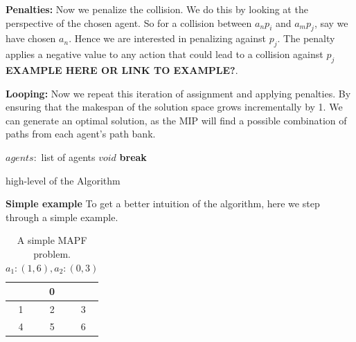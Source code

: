 \documentclass[a4paper,11pt]{article}
\newcommand{\Break}{\State\textbf{break}}
\begin{document}
\noindent \textbf{Penalties:} Now we penalize the collision. We do this by looking at the perspective of the chosen agent. So for a collision between $a_np_i$ and $a_mp_j$, say we have chosen $a_n$. Hence we are interested in penalizing against $p_j$. The penalty applies a negative value to any action that could lead to a collision against $p_j$ \textbf{EXAMPLE HERE OR LINK TO EXAMPLE?}.

\noindent \textbf{Looping:} Now we repeat this iteration of assignment and applying penalties. By ensuring that the makespan of the solution space grows incrementally by 1. We can generate an optimal solution, as the MIP will find a possible combination of paths from each agent's path bank.

\begin{algorithm}[H]
	\begin{algorithmic}[1]
		\Require $agents:$ list of agents
		\Ensure $void$
		\State{}
		\EndFor
		\State{}
		\Loop
			\Else
				\Break
			\EndIf
		\EndLoop
	\end{algorithmic}
	
	\caption{high-level of the Algorithm} \label{alg:agent-coordinator}
\end{algorithm}

\noindent \textbf{Simple example} To get a better intuition of the algorithm, here we step through a simple example.

\begin{table}[h]
	\centering
	\footnotesize
	\begin{tabular}{|c|c|c|}
		\hline
		\cellcolor{black} & 0 & \cellcolor{black} \\ \hline
		1 & 2 & 3 \\ \hline
		4 & 5 & 6 \\ \hline
	\end{tabular}
	
	\caption{A simple MAPF problem. $a_1: (1, 6), a_2: (0, 3)$}
	\label{fig:simple-step-through-example}
\end{table}
\end{document}
